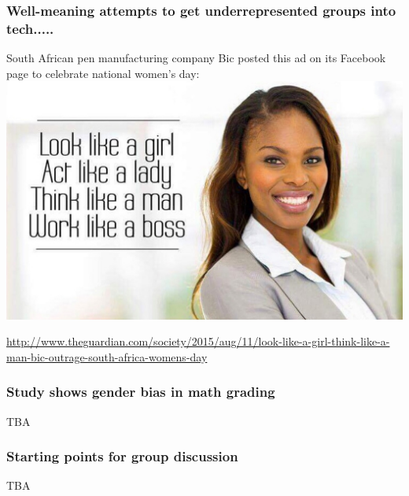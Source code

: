 \documentclass{beamer}
\begin{document}
\begin{frame}
\frametitle{Well-meaning attempts to get underrepresented groups into tech.....}
South African pen manufacturing company Bic posted this ad on its Facebook page to celebrate national women's day:
\includegraphics[scale=0.15]{thinklikeaman.jpg}

{\tiny \href{http://www.theguardian.com/society/2015/aug/11/look-like-a-girl-think-like-a-man-bic-outrage-south-africa-womens-day}{http://www.theguardian.com/society/2015/aug/11/look-like-a-girl-think-like-a-man-bic-outrage-south-africa-womens-day}}
\end{frame}

\begin{frame}
\frametitle{Study shows gender bias in math grading}
TBA
\end{frame}

\begin{frame}
\frametitle{Starting points for group discussion}
TBA
\end{frame}
\end{document}
